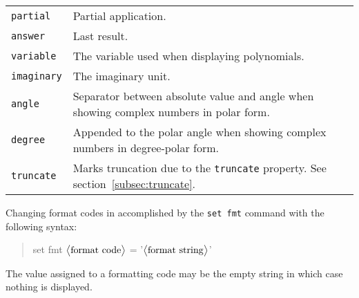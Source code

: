 \documentclass[10pt]{article}
\newcommand{\argument}[1]{{${\big<}\text{\textrm{#1}}{\big>}$}}
\newenvironment{code}{\begin{quote}\ttfamily}{\end{quote}}
\begin{document}
\begin{longtable}{p{}p{}}
        \verb|partial|         & Partial application. \\
        \verb|answer|          & Last result. \\
        \verb|variable|        & The variable used when displaying polynomials. \\
        \verb|imaginary|       & The imaginary unit. \\
        \verb|angle|           & Separator between absolute value and angle when showing complex numbers in polar form. \\
        \verb|degree|          & Appended to the polar angle when showing complex numbers in degree-polar form. \\
        \verb|truncate|        & Marks truncation due to the \texttt{truncate} property. See section~\ref{subsec:truncate}. \\
    \end{longtable}
    Changing format codes in accomplished by the \verb|set fmt| command with the following syntax:
    \begin{code}
        set fmt \argument{format code} = '\argument{format string}' \\
    \end{code}
    The value assigned to a formatting code may be the empty string in which case nothing is displayed.
\end{document}
